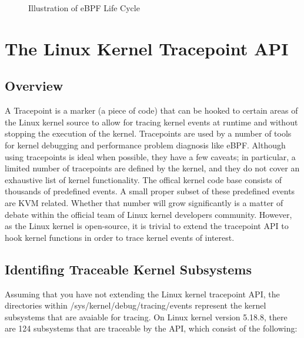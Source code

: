 \documentclass{report}
\begin{document}
\begin{spacing}{1.5}
\newpage
\vfill
{}
\begin{figure}[ht]
    \hspace*{-2cm}  
    \centering
    \caption{Illustration of eBPF Life Cycle}
\end{figure}


\section{The Linux Kernel Tracepoint API}

\subsection{Overview}

{\large
A Tracepoint is a marker (a piece of code) that can be hooked to certain areas of the Linux kernel source to allow for tracing kernel events at runtime and without stopping the execution of the kernel. Tracepoints are used by a number of tools for kernel debugging and performance problem diagnosis like eBPF. Although using tracepoints is ideal when possible, they have a few caveats; in particular, a limited number of tracepoints are defined by the kernel, and they do not cover an exhaustive list of kernel functionality. The offical kernel code base consists of thousands of predefined events. A small proper subset of these predefined events are KVM related. Whether that number will grow significantly is a matter of debate within the official team of Linux kernel developers community. However, as the Linux kernel is open-source, it is trivial to extend the tracepoint API to hook kernel functions in order to trace kernel events of interest.
\newline
}


\subsection{Identifing Traceable Kernel Subsystems}

{\large
Assuming that you have not extending the Linux kernel tracepoint API, the directories within /sys/kernel/debug/tracing/events represent the kernel subsystems that are avaiable for tracing. On Linux kernel version 5.18.8, there are 124 subsystems that are traceable by the API, which consist of the following:
\leavevmode\newline
}


\end{spacing}
\end{document}
